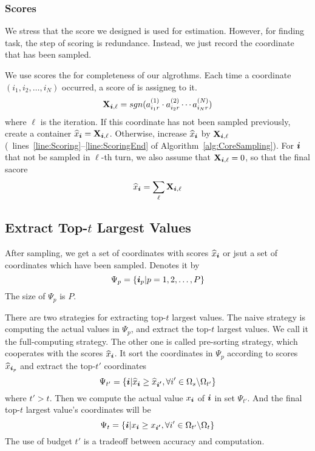\documentclass[letterpaper]{article}
\newcommand{\Sca}[3]{{#1}^{(#2)}_{i_#2#3}}%
\newcommand{\V}[1]{{\bm{{\MakeLowercase{#1}}}}}
\newcommand{\M}[1]{{\bm{\mathbf{\MakeUppercase{#1}}}}}
\newcommand{\AlgLines}[3]{lines~\ref{line:#2}--\ref{line:#3} of Algorithm~\ref{alg:#1}}
\newcommand{\Coord}{(i_1,i_2,\ldots,i_N)}
\newcommand{\predx}{\widehat{x}_{\V{i}}}
\begin{document}
\subsubsection{Scores}
We stress that the score we designed is used for estimation.
However, for finding task, the step of scoring is redundance.
Instead, we just record the coordinate that has been sampled.

We use scores the for completeness of our algrothms.
Each time a coordinate $\Coord $ occurred, a score of is assigneg to it.
\[
\M{X}_{\V{i},\ell}  = sgn(\Sca{a}{1}{r}\cdot\Sca{a}{2}{r}\cdots\Sca{a}{N}{r})
\]
where $\ell$ is the iteration.
If this coordinate has not been sampled previously,
create a container $\predx = \M{X}_{\V{i},\ell}$.
Otherwise, increase $\predx$ by $\M{X}_{\V{i},\ell}$
(~\AlgLines{CoreSampling}{Scoring}{ScoringEnd}).
For $\V{i}$ that not be sampled in $\ell$-th turn,
we also assume that $\M{X}_{\V{i},\ell}=0$,
so that the final sacore
\begin{equation}\label{eq:score}
\predx = \sum_{\ell} \M{X}_{\V{i},\ell}
\end{equation}

\subsection{Extract Top-$t$ Largest Values}
After sampling, we get a set of coordinates with scores $\predx$
or jsut a set of coordinates which have been sampled.
Denotes it by
\[
    \Psi_p = \{\V{i}_p|p = 1,2,\ldots,P\}
\]
The size of $\Psi_p$ is $P$.

There are two strategies for extracting top-$t$ largest values.
The naive strategy is computing the actual values in $\Psi_p$,
and extract the top-$t$ largest values.
We call it the full-computing strategy.
The other one is called pre-sorting strategy, which cooperates with the scores $\predx$.
It sort the coordinates in $\Psi_p$ according to scores $\widehat{x}_{\V{i}_p}$
and extract the top-$t'$ coordinates
\[
    \Psi_{t'} = \{ \V{i} | \predx \geq \widehat{x}_{\V{i'}},
                           \forall i'\in \Omega_{s} \backslash \Omega_{t'}
                \}
\]  where $t'>t$.
Then we compute the actual value $x_{\V{i}}$ of $\V{i}$ in set $\Psi_{t'}$.
And the final top-$t$ largest value's coordinates will be
\[
    \Psi_{t} =
                \{ \V{i} | x_{\V{i}}\geq x_{\V{i'}},
                           \forall i' \in \Omega_{t'} \backslash \Omega_{t}
                \}
\]
The use of budget $t'$ is a tradeoff between accuracy and computation.
\end{document}
